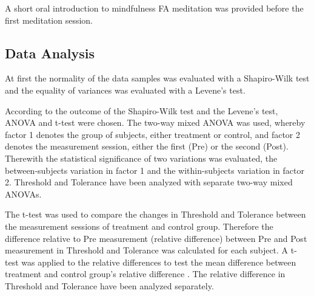 A short oral introduction to mindfulness FA meditation was provided before the first meditation session. 

\subsection{Data Analysis}

At first the normality of the data samples was evaluated with a Shapiro-Wilk test and the equality of variances was evaluated with a Levene's test. 

According to the outcome of the Shapiro-Wilk test and the Levene’s test, ANOVA and t-test were chosen. The two-way mixed ANOVA was used, whereby factor 1 denotes the group of subjects, either treatment or control, and factor 2 denotes the measurement session, either the first (Pre) or the second (Post). Therewith the statistical significance of two variations was evaluated, the between-subjects variation in factor 1 and the within-subjects variation in factor 2. \cite{Mooi2018} Threshold and Tolerance have been analyzed with separate two-way mixed ANOVAs.

The t-test was used to compare the changes in Threshold and Tolerance between the measurement sessions of treatment and control group. Therefore the difference relative to Pre measurement (relative difference) between Pre and Post measurement in Threshold and Tolerance was calculated for each subject. A t-test was applied to the relative differences to test the mean difference between treatment and control group’s relative difference \cite{Mooi2018}. 
The relative difference in Threshold and Tolerance have been analyzed separately. 
